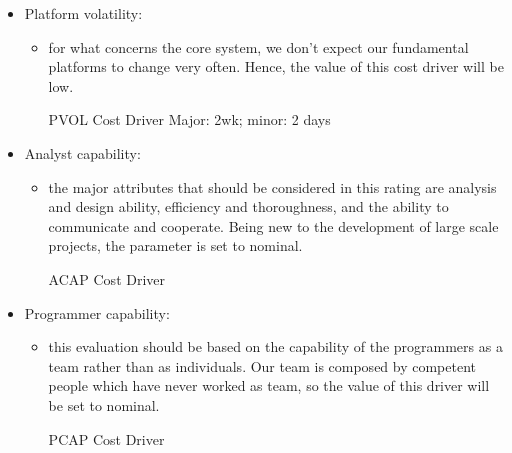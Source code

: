\begin{itemize}
	\item Platform volatility: 
	\begin{itemize}
	\item[] for what concerns the core system, we don't expect our fundamental platforms to change very often. Hence, the value of this cost driver will be low.
	\begin{costdriverstable}{PVOL Cost Driver}
			{Major: 2wk; minor: 2 days}{}\hline
	\end{costdriverstable}
	\end{itemize}
\end{itemize}

\begin{itemize}
	\item Analyst capability: 
	\begin{itemize}
	\item[] the major attributes that should be considered in this rating are analysis and design ability, efficiency and thoroughness, and the ability to communicate and cooperate. Being new to the development of large scale projects, the parameter is set to nominal.
	\begin{costdriverstable}{ACAP Cost Driver}
		\hline
	\end{costdriverstable}
	\end{itemize}
\end{itemize}

\begin{itemize}
	\item Programmer capability: 
	\begin{itemize}
	\item[] this evaluation should be based on the capability of the programmers as a team rather than as individuals. Our team is composed by competent people which have never worked as team, so the value of this driver will be set to nominal.
	\begin{costdriverstable}{PCAP Cost Driver}
		\hline
	\end{costdriverstable}
	\end{itemize}
\end{itemize}

